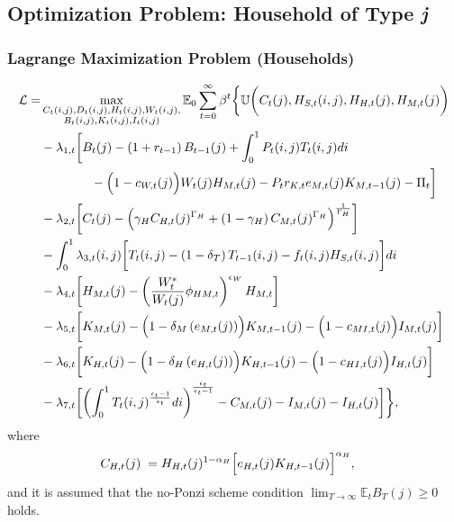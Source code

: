 \documentclass[12pt,3p,authoryear,review]{elsarticle}
\begin{document}
\subsection{Optimization Problem: Household of Type \textit{j}}%
\begin{small}%
	\subsubsection{Lagrange Maximization Problem (Households)}%
	\vspace{-0.2in}%
	\begin{align*}%
		\mathcal{L} = & \max_{\substack{C_t(i,j), D_t(i,j), H_t(i,j), W_t(i,j),\\B_t(i,j), K_t(i,j), I_t(i,j)}} \mathbb{E}_0 \sum_{t=0}^{\infty} \beta^t \biggl\{ \mathbb{U} \biggl(C_t(j), H_{S,t}(i,j), H_{H,t}(j), H_{M,t}(j)\biggr)\\%
		& - \lambda_{1,t} \biggl[ B_t(j) - \left(1+r_{t-1}\right) B_{t-1}(j) + \int_0^1 P_t(i,j) T_t(i,j) di\\%
		& \quad \quad \quad \quad - \Bigl(1-c_{W,t}(j)\Bigr) W_t(j) H_{M,t}(j) - P_{t} r_{K,t} e_{M,t}(j) K_{M,t-1}(j) - \Pi_{t} \biggr]\\%
		& - \lambda_{2,t} \biggl[ C_t(j) - \Bigl( \gamma_H C_{H,t}(j)^{\Gamma_H} + \left(1-\gamma_H\right) C_{M,t}(j)^{\Gamma_H} \Bigr)^{\frac{1}{\Gamma_H}} \biggr]\\%
		& - \int_0^1 \lambda_{3,t}(i,j) \biggl[ T_t(i,j) - \left(1-\delta_T\right) T_{t-1}(i,j) - f_t(i,j) H_{S,t}(i,j) \biggr] di\\%
		& - \lambda_{4,t} \biggl[ H_{M,t}(j) - \left(\frac{W_t^*}{W_{t}(j)}\phi_{HM,t}\right)^{\epsilon_W} H_{M,t} \biggr]\\%
		& - \lambda_{5,t} \biggl[ K_{M,t}(j) - \Bigl( 1 - \delta_M \left(e_{M,t}(j)\right) \Bigr)  K_{M,t-1}(j) - \Bigl(1-c_{MI,t}(j)\Bigr) I_{M,t}(j) \biggr]\\%
		& - \lambda_{6,t} \biggl[ K_{H,t}(j) - \Bigl( 1 - \delta_H \left(e_{H,t}(j)\right) \Bigr)  K_{H,t-1}(j) - \Bigl(1-c_{HI,t}(j)\Bigr) I_{H,t}(j) \biggr]\\%
		& - \lambda_{7,t} \biggl[ \left(\int_0^1 T_t(i,j)^{\frac{\epsilon_t-1}{\epsilon_t}} di \right)^{\frac{\epsilon_t}{\epsilon_t-1}} - C_{M,t}(j) - I_{M,t}(j) - I_{H,t}(j) \biggr] \biggr\},%
	\end{align*}%
	where%
	\begin{align*}%
		C_{H,t}(j) \; = & \; H_{H,t}(j)^{1-\alpha_H} \Bigl[ e_{H,t}(j)K_{H,t-1}(j)\Bigr]^{\alpha_H},
	\end{align*}%
	and it is assumed that the no-Ponzi scheme condition $\lim_{T\rightarrow\infty} \mathbb{E}_t B_T(j) \geq 0$ holds.%
\end{small}%
\pagebreak%
\end{document}
